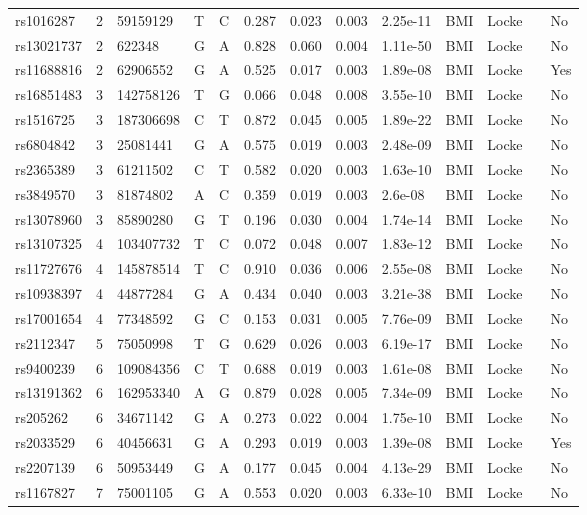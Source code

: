 \documentclass[11pt,twoside]{bristolthesis}
\begin{document}
\begin{longtable}[t]{lrlllrrrlllll}
rs1016287 & 2 & 59159129 & T & C & 0.287 & 0.023 & 0.003 & 2.25e-11 & BMI & Locke &  & No\\
rs13021737 & 2 & 622348 & G & A & 0.828 & 0.060 & 0.004 & 1.11e-50 & BMI & Locke &  & No\\
rs11688816 & 2 & 62906552 & G & A & 0.525 & 0.017 & 0.003 & 1.89e-08 & BMI & Locke &  & Yes\\
\addlinespace
rs16851483 & 3 & 142758126 & T & G & 0.066 & 0.048 & 0.008 & 3.55e-10 & BMI & Locke &  & No\\
rs1516725 & 3 & 187306698 & C & T & 0.872 & 0.045 & 0.005 & 1.89e-22 & BMI & Locke &  & No\\
rs6804842 & 3 & 25081441 & G & A & 0.575 & 0.019 & 0.003 & 2.48e-09 & BMI & Locke &  & No\\
rs2365389 & 3 & 61211502 & C & T & 0.582 & 0.020 & 0.003 & 1.63e-10 & BMI & Locke &  & No\\
rs3849570 & 3 & 81874802 & A & C & 0.359 & 0.019 & 0.003 & 2.6e-08 & BMI & Locke &  & No\\
\addlinespace
rs13078960 & 3 & 85890280 & G & T & 0.196 & 0.030 & 0.004 & 1.74e-14 & BMI & Locke &  & No\\
rs13107325 & 4 & 103407732 & T & C & 0.072 & 0.048 & 0.007 & 1.83e-12 & BMI & Locke &  & No\\
rs11727676 & 4 & 145878514 & T & C & 0.910 & 0.036 & 0.006 & 2.55e-08 & BMI & Locke &  & No\\
rs10938397 & 4 & 44877284 & G & A & 0.434 & 0.040 & 0.003 & 3.21e-38 & BMI & Locke &  & No\\
rs17001654 & 4 & 77348592 & G & C & 0.153 & 0.031 & 0.005 & 7.76e-09 & BMI & Locke &  & No\\
\addlinespace
rs2112347 & 5 & 75050998 & T & G & 0.629 & 0.026 & 0.003 & 6.19e-17 & BMI & Locke &  & No\\
rs9400239 & 6 & 109084356 & C & T & 0.688 & 0.019 & 0.003 & 1.61e-08 & BMI & Locke &  & No\\
rs13191362 & 6 & 162953340 & A & G & 0.879 & 0.028 & 0.005 & 7.34e-09 & BMI & Locke &  & No\\
rs205262 & 6 & 34671142 & G & A & 0.273 & 0.022 & 0.004 & 1.75e-10 & BMI & Locke &  & No\\
rs2033529 & 6 & 40456631 & G & A & 0.293 & 0.019 & 0.003 & 1.39e-08 & BMI & Locke &  & Yes\\
\addlinespace
rs2207139 & 6 & 50953449 & G & A & 0.177 & 0.045 & 0.004 & 4.13e-29 & BMI & Locke &  & No\\
rs1167827 & 7 & 75001105 & G & A & 0.553 & 0.020 & 0.003 & 6.33e-10 & BMI & Locke &  & No\\

\end{longtable}
\end{document}
